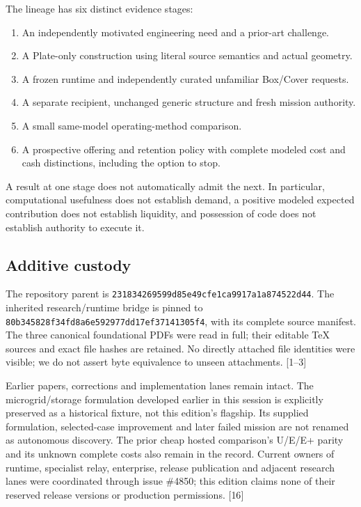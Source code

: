 \documentclass[
  11pt,
]{article}
\providecommand{\tightlist}{%
  \setlength{\itemsep}{0pt}\setlength{\parskip}{0pt}}
\let\OriginalSubsection\subsection
\renewcommand{\subsection}{\needspace{6\baselineskip}\OriginalSubsection}
\begin{document}
The lineage has six distinct evidence stages:

\begin{enumerate}
\def\labelenumi{\arabic{enumi}.}
\tightlist
\item
  An independently motivated engineering need and a prior-art challenge.
\item
  A Plate-only construction using literal source semantics and actual
  geometry.
\item
  A frozen runtime and independently curated unfamiliar Box/Cover
  requests.
\item
  A separate recipient, unchanged generic structure and fresh mission
  authority.
\item
  A small same-model operating-method comparison.
\item
  A prospective offering and retention policy with complete modeled cost
  and cash distinctions, including the option to stop.
\end{enumerate}

A result at one stage does not automatically admit the next. In
particular, computational usefulness does not establish demand, a
positive modeled expected contribution does not establish liquidity, and
possession of code does not establish authority to execute it.

\hypertarget{additive-custody}{%
\subsection{Additive custody}\label{additive-custody}}

The repository parent is
\texttt{23183426\allowbreak{}9599d85e\allowbreak{}49cfe1ca\allowbreak{}9917a1a8\allowbreak{}74522d44}. The inherited
research/runtime bridge is pinned to
\texttt{80b34582\allowbreak{}8f34fd8a\allowbreak{}6e592977\allowbreak{}dd17ef37\allowbreak{}141305f4}, with its complete
source manifest. The three canonical foundational PDFs were read in
full; their editable TeX sources and exact file hashes are retained. No
directly attached file identities were visible; we do not assert byte
equivalence to unseen attachments. {[}1--3{]}

Earlier papers, corrections and implementation lanes remain intact. The
microgrid/storage formulation developed earlier in this session is
explicitly preserved as a historical fixture, not this edition's
flagship. Its supplied formulation, selected-case improvement and later
failed mission are not renamed as autonomous discovery. The prior cheap
hosted comparison's U/E/E+ parity and its unknown complete costs also
remain in the record. Current owners of runtime, specialist relay,
enterprise, release publication and adjacent research lanes were
coordinated through issue \#4850; this edition claims none of their
reserved release versions or production permissions. {[}16{]}
\end{document}
